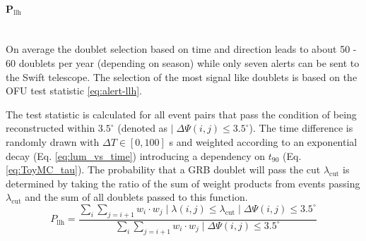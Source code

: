 \paragraph{P$_{\text{llh}}$}$\;$\\
On average the doublet selection based on time and direction leads to about 50 -
60
doublets per year (depending on season) while only seven alerts can be sent to
the Swift telescope. The
selection of the most signal like doublets is based on the OFU test statistic 
\ref{eq:alert-llh}.
% 

The test statistic is calculated for all event pairs that pass the condition of
being reconstructed within $3.5^\circ$ (denoted as $| \; \Delta \Psi(i, j) \leq 
3.5^{\circ}$). The time difference is randomly drawn
with $\Delta T \in [0, 100]$ s and weighted according to an exponential decay
(Eq. \ref{eq:lum_vs_time}) introducing a dependency on $t_{90}$
(Eq. \ref{eq:ToyMC_tau}).
The probability that
a GRB doublet will pass the cut $\lambda_\text{cut}$ is determined by taking 
the ratio of the sum of
weight
products from events passing $\lambda_\text{cut}$ and the sum of all doublets 
passed to this
function.
\begin{equation}
\label{eq:Pllh}
 P_\text{llh} = \frac{\sum_{i} \sum_{j=i+1} w_i \cdot w_j \; | \; \lambda(i, j)
\leq \lambda_\text{cut} \; | \; \Delta \Psi(i, j) \leq 3.5^{\circ}}{\sum_i
\sum_{j=i+1} w_i \cdot w_j \; | \; \Delta \Psi(i, j) \leq 3.5^{\circ}}
\end{equation}

